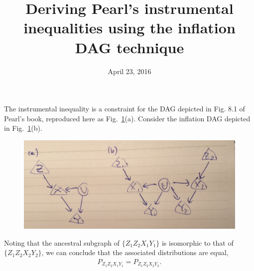 \documentclass[amsmath,amssymb,aps,nofootinbib,notitlepage,superscriptaddress]{revtex4-1}%
\begin{document}
\title{Deriving Pearl's instrumental inequalities using the inflation DAG technique}
\date{April 23, 2016}                                           %
\maketitle



The instrumental inequality is a constraint for the DAG depicted in Fig. 8.1 of Pearl's book, reproduced here as Fig.~\ref{fig1}(a).  Consider the inflation DAG depicted in Fig.~\ref{fig1}(b).

\begin{figure}[h!]
\centering
\includegraphics[scale=0.08]{InstrumentalDAG.jpg}
\label{fig1}
\end{figure}


Noting that the ancestral subgraph of $\{ Z_1 Z_2 X_1 Y_1\}$ is isomorphic to that of $\{ Z_1 Z_2 X_2 Y_2\}$, we can conclude that the associated distributions are equal,
\begin{align}\label{equiv}
P_{Z_1 Z_2 X_1 Y_1}= P_{Z_1 Z_2 X_2 Y_2}.
\end{align}
\end{document}
